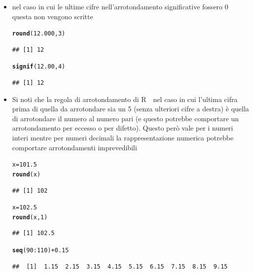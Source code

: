 \documentclass[onecolumn,11pt]{book}\usepackage[]{graphicx}\usepackage[]{color}
\makeatletter
\newcommand{\hlnum}[1]{\textcolor[rgb]{0.686,0.059,0.569}{#1}}%
\newcommand{\hlopt}[1]{\textcolor[rgb]{0,0,0}{#1}}%
\newcommand{\hlstd}[1]{\textcolor[rgb]{0.345,0.345,0.345}{#1}}%
\newcommand{\hlkwb}[1]{\textcolor[rgb]{0.69,0.353,0.396}{#1}}%
\newcommand{\hlkwd}[1]{\textcolor[rgb]{0.737,0.353,0.396}{\textbf{#1}}}%
\newenvironment{kframe}{%
 \def\at@end@of@kframe{}%
 \ifinner\ifhmode%
  \def\at@end@of@kframe{\end{minipage}}%
  \begin{minipage}{\columnwidth}%
 \fi\fi%
 \def\FrameCommand##1{\hskip\@totalleftmargin \hskip-\fboxsep
 \colorbox{shadecolor}{##1}\hskip-\fboxsep
     \hskip-\linewidth \hskip-\@totalleftmargin \hskip\columnwidth}%
 \MakeFramed {\advance\hsize-\width
   \@totalleftmargin\z@ \linewidth\hsize
   \@setminipage}}%
 {\par\unskip\endMakeFramed%
 \at@end@of@kframe}
\newenvironment{knitrout}{}{} %
\newcommand{\rpr}{\textsf{R}~}
\makeatother
\begin{document}
\begin{itemize}
\item nel caso in cui le ultime cifre nell'arrotondamento  significative fossero 0 questa non vengono scritte
\begin{knitrout}
\color{fgcolor}\begin{kframe}
\begin{alltt}
\hlkwd{round}\hlstd{(}\hlnum{12.000}\hlstd{,}\hlnum{3}\hlstd{)}
\end{alltt}
\begin{verbatim}
## [1] 12
\end{verbatim}
\begin{alltt}
\hlkwd{signif}\hlstd{(}\hlnum{12.00}\hlstd{,}\hlnum{4}\hlstd{)}
\end{alltt}
\begin{verbatim}
## [1] 12
\end{verbatim}
\end{kframe}
\end{knitrout}
\item
Si noti che la regola di arrotondamento di \rpr\ nel caso in cui l'ultima cifra prima di quella da arrotondare sia un 5 (senza ulteriori cifre a destra) \`e quella di arrotondare il numero al numero pari  (e questo potrebbe comportare un arrotondamento per eccesso o per difetto). Questo per\`o vale per i numeri interi mentre per numeri decimali la rappresentazione numerica potrebbe comportare arrotondamenti imprevedibili
\begin{knitrout}
\color{fgcolor}\begin{kframe}
\begin{alltt}
\hlstd{x}\hlkwb{=}\hlnum{101.5}
\hlkwd{round}\hlstd{(x)}
\end{alltt}
\begin{verbatim}
## [1] 102
\end{verbatim}
\begin{alltt}
\hlstd{x}\hlkwb{=}\hlnum{102.5}
\hlkwd{round}\hlstd{(x,}\hlnum{1}\hlstd{)}
\end{alltt}
\begin{verbatim}
## [1] 102.5
\end{verbatim}
\begin{alltt}
\hlkwd{seq}\hlstd{(}\hlnum{90}\hlopt{:}\hlnum{110}\hlstd{)}\hlopt{+}\hlnum{0.15}
\end{alltt}
\begin{verbatim}
##  [1]  1.15  2.15  3.15  4.15  5.15  6.15  7.15  8.15  9.15

\end{verbatim}
\end{kframe}
\end{knitrout}
\end{itemize}
\end{document}
